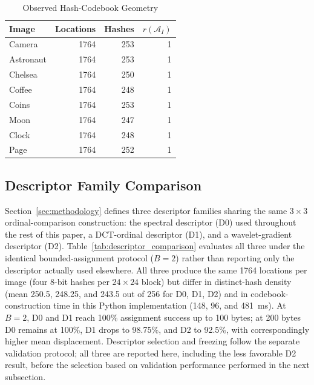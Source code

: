 \documentclass[preprint,12pt]{elsarticle}
\theoremstyle{plain}
\providecommand{\DIFaddtex}[1]{{\protect\color{blue} \sf #1}} %
\providecommand{\DIFdeltex}[1]{{\protect\color{red} \scriptsize #1}} %
\providecommand{\DIFaddbegin}{} %
\providecommand{\DIFaddend}{} %
\providecommand{\DIFdelbegin}{} %
\providecommand{\DIFdelend}{} %
\providecommand{\DIFadd}[1]{\texorpdfstring{\DIFaddtex{#1}}{#1}} %
\providecommand{\DIFdel}[1]{\texorpdfstring{\DIFdeltex{#1}}{}} %
\providecommand{\DIFscaledelfig}{0.5}
\newlength{\DIFdelgraphicswidth} %
\newlength{\DIFdelgraphicsheight} %
\providecommand{\DIFaddincludegraphics}[2][]{{\color{blue}\fbox{\DIFOincludegraphics[#1]{#2}}}} %
\providecommand{\DIFdelincludegraphics}[2][]{%
\sbox{\DIFdelgraphicsbox}{\DIFOincludegraphics[#1]{#2}}%
\settoboxwidth{\DIFdelgraphicswidth}{\DIFdelgraphicsbox} %
\settoboxtotalheight{\DIFdelgraphicsheight}{\DIFdelgraphicsbox} %
\scalebox{\DIFscaledelfig}{%
\parbox[b]{\DIFdelgraphicswidth}{\usebox{\DIFdelgraphicsbox}\\[-\baselineskip] \rule{\DIFdelgraphicswidth}{0em}}\llap{\resizebox{\DIFdelgraphicswidth}{\DIFdelgraphicsheight}{%
\setlength{\unitlength}{\DIFdelgraphicswidth}%
\begin{picture}(1,1)%
\thicklines\linethickness{2pt} %
{\color[rgb]{1,0,0}\put(0,0){\framebox(1,1){}}}%
{\color[rgb]{1,0,0}\put(0,0){\line( 1,1){1}}}%
{\color[rgb]{1,0,0}\put(0,1){\line(1,-1){1}}}%
\end{picture}%
}\hspace*{3pt}}} %
} %
\DeclareRobustCommand{\DIFaddbegin}{\DIFOaddbegin \let\includegraphics\DIFaddincludegraphics} %
\DeclareRobustCommand{\DIFaddend}{\DIFOaddend \let\includegraphics\DIFOincludegraphics} %
\DeclareRobustCommand{\DIFdelbegin}{\DIFOdelbegin \let\includegraphics\DIFdelincludegraphics} %
\DeclareRobustCommand{\DIFdelend}{\DIFOaddend \let\includegraphics\DIFOincludegraphics} %
\renewcommand{\DIFdel}[1]{}
\renewcommand{\DIFdelincludegraphics}[2][]{}
\begin{document}
\begin{table}[!t]
\centering
\caption{Observed Hash-Codebook Geometry}
\label{tab:codebook_geometry}
\begin{tabular}{lrrr}
\toprule
\textbf{Image} & \textbf{Locations} & \textbf{Hashes} & $r(\mathcal{A}_I)$ \\
\midrule
Camera    & 1764 & 253 & 1 \\
Astronaut & 1764 & 253 & 1 \\
Chelsea   & 1764 & 250 & 1 \\
Coffee    & 1764 & 248 & 1 \\
Coins     & 1764 & 253 & 1 \\
Moon      & 1764 & 247 & 1 \\
Clock     & 1764 & 248 & 1 \\
Page      & 1764 & 252 & 1 \\
\bottomrule
\end{tabular}
\end{table}

\subsection{Descriptor Family Comparison}

Section~\ref{sec:methodology} defines three descriptor families sharing the
same $3\times3$ ordinal-comparison construction: the spectral descriptor
(D0) used throughout the rest of this paper, a DCT-ordinal descriptor (D1),
and a wavelet-gradient descriptor (D2). Table~\ref{tab:descriptor_comparison}
evaluates all three under the identical bounded-assignment protocol
($B=2$) rather than reporting only the descriptor actually used elsewhere.
All three produce the same 1764 locations per image (four 8-bit hashes per
$24\times24$ block) but differ in distinct-hash density (mean 250.5, 248.25,
and 243.5 out of 256 for D0, D1, D2) and in codebook-construction time in this
Python implementation (148, 96, and 481~ms). At $B=2$, D0 and D1 reach 100\%
assignment success up to 100 bytes; at 200 bytes D0 remains at 100\%, D1
drops to 98.75\%, and D2 to 92.5\%, with correspondingly higher mean
displacement. Descriptor selection and freezing follow the separate
validation protocol; all three are reported here, including the less favorable D2 result, before
the \DIFdelbegin \DIFdel{validation-gated selection }\DIFdelend \DIFaddbegin \DIFadd{selection based on validation performance }\DIFaddend performed in the next subsection.

\begin{table}[!t]
\centering
\caption{Descriptor Family Comparison Under the Bounded Assignment Protocol ($B=2$)}
\label{tab:descriptor_comparison}
\resizebox{\linewidth}{!}{}
\end{table}
\end{document}
